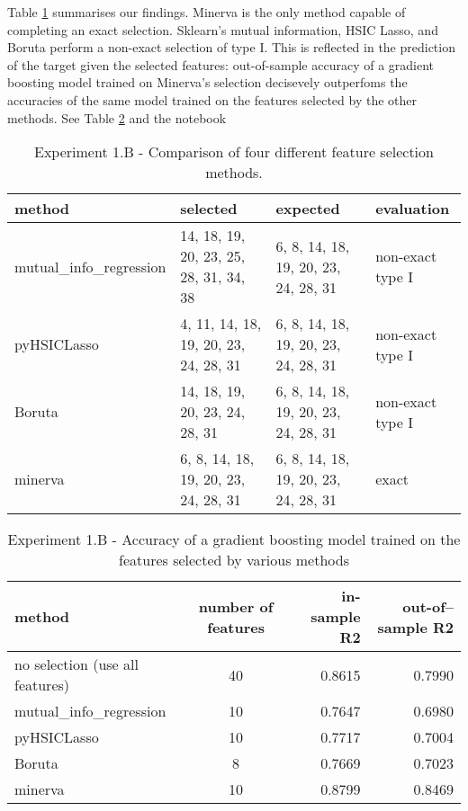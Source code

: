 Table
\ref{tab.experiment1B}
summarises our findings. 
Minerva is the only method capable of completing an exact selection.
Sklearn's mutual information, 
HSIC Lasso,
and 
Boruta
perform a non-exact selection of type I.
This is reflected in the prediction of the target given the selected features:
out-of-sample accuracy of a gradient boosting model
trained on Minerva's selection
decisevely outperfoms
the accuracies of the same model trained on
the features selected by the other methods.
See 
Table \ref{tab.experiment1Baccuracy}
and
the notebook






\begin{table}
	\centering
{
	\begin{tabular}{l|l|l|l}
		\textbf{method}
		&
		\textbf{selected}
		&
		\textbf{expected}
		&
		\textbf{evaluation}
		\\
		\hline
		mutual\_info\_regression
		&
		\tiny{
		14, 18, 19, 20, 23, 25, 28, 31, 34, 38
	}
		& 
		\tiny{
		6, 8, 14, 18, 19, 20, 23, 24, 28, 31
	}
		&
		non-exact type I
		\\
		pyHSICLasso
		&
		\tiny{
		4, 11, 14, 18, 19, 20, 23, 24, 28, 31
	}
		& 
		\tiny{
		6, 8, 14, 18, 19, 20, 23, 24, 28, 31
	}
		&
		non-exact type I
		\\
		Boruta
		&
		\tiny{
		14, 18, 19, 20, 23, 24, 28, 31
	}
		& 
		\tiny{
		6, 8, 14, 18, 19, 20, 23, 24, 28, 31
	}
		&
		non-exact type I
		\\
		minerva
		& 
		\tiny{
		6, 8, 14, 18, 19, 20, 23, 24, 28, 31
	}
		&
		\tiny{
		6, 8, 14, 18, 19, 20, 23, 24, 28, 31
	}
		&
		exact
	\end{tabular}
}
\caption{Experiment 1.B - Comparison of four different feature selection methods.}
\label{tab.experiment1B}
\end{table}


\begin{table}
	\centering
{
	\begin{tabular}{l|c|r|r}
		\textbf{method}
		&
		\textbf{number of features}
		&
		\textbf{in-sample R2}
		&
		\textbf{out-of--sample R2}
		\\
		\hline
		no selection (use all features)
		&
		40
		&
		0.8615
		&
		0.7990
		\\
		mutual\_info\_regression
		&
		10
		&
		0.7647
		& 
		0.6980
		\\
		pyHSICLasso
		&
		10
		& 
		0.7717
		&
		0.7004
		\\
		Boruta
		&
		8
		& 
		0.7669
		&
		0.7023
		\\
		minerva
		& 
		10
		&
		0.8799
		&
		0.8469
	\end{tabular}
}
\caption{Experiment 1.B - Accuracy of a gradient boosting model trained on the features selected by various methods}
\label{tab.experiment1Baccuracy}
\end{table}

